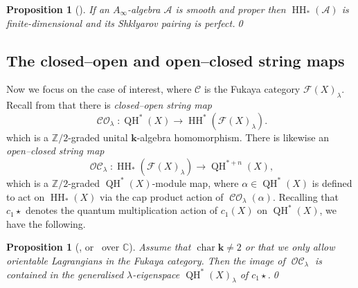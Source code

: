 \documentclass[10pt]{amsart}
\newtheorem{proposition}[theorem]{Proposition}
\theoremstyle{definition}
\newcommand{\CC}{\mathbb{C}}
\newcommand{\ZZ}{\mathbb{Z}}
\newcommand{\calA}{\mathcal{A}}
\newcommand{\calC}{\mathcal{C}}
\newcommand{\Fuk}{\mathcal{F}}
\newcommand{\kk}{{\boldsymbol{k}}}
\newcommand{\Char}{\operatorname{char}}
\newcommand{\HH}{\operatorname{HH}}
\newcommand{\CO}{\operatorname{\mathcal{CO}}}
\newcommand{\OC}{\operatorname{\mathcal{OC}}}
\newcommand{\QH}{\operatorname{QH}}
\newcommand{\qprod}{\mathbin{\star}}
\begin{document}
\begin{proposition}[{\cite[Prop.\,5.24]{SheridanHodge}}]
\label{propSmoothProper}
If an $A_\infty$-algebra $\calA$ is smooth and proper then $\HH_*(\calA)$ is finite-dimensional and its Shklyarov pairing is perfect.\qed
\end{proposition}

\subsection{The closed--open and open--closed string maps}
\label{sscStringMaps}

Now we focus on the case of interest, where $\calC$ is the Fukaya category $\Fuk(X)_\lambda$. Recall from \cite[\S\S 2.5--2.6]{SheridanFano} that there is \emph{closed--open string map}
\[
\CO_\lambda : \QH^*(X) \to \HH^*(\Fuk(X)_\lambda).
\]
which is a $\ZZ/2$-graded unital $\kk$-algebra homomorphism. There is likewise an \emph{open--closed string map}
\[
\OC_\lambda : \HH_*(\Fuk(X)_\lambda) \to \QH^{*+n}(X),
\]
which is a $\ZZ/2$-graded $\QH^*(X)$-module map, where $\alpha \in \QH^*(X)$ is defined to act on $\HH_*(X)$ via the cap product action of $\CO_\lambda(\alpha)$. Recalling that $c_1 \qprod$ denotes the quantum multiplication action of $c_1(X)$ on $\QH^*(X)$, we have the following.

\begin{proposition}[{\cite[Th.\,9.5(1)]{RitterSmith}, or~\cite[Cor.\,2.11]{SheridanFano} over $\CC$}]
\label{propEspace}
Assume that $\Char \kk \neq 2$ or that we only allow orientable Lagrangians in the Fukaya category. Then the image of $\OC_\lambda$ is contained in the generalised $\lambda$-eigenspace $\QH^*(X)_\lambda$ of $c_1 \qprod$.\qed
\end{proposition}
\end{document}
